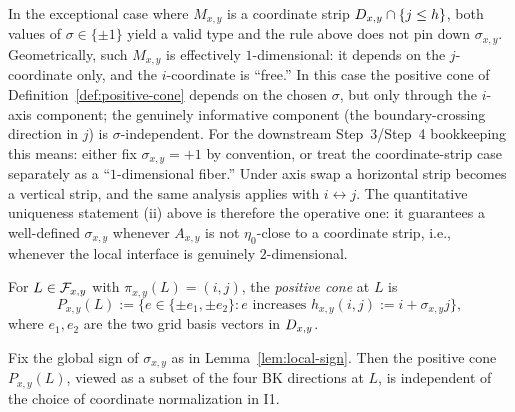 \begin{remark}\label{rem:strip-degeneracy}
In the exceptional case where $M_{x,y}$ is a coordinate strip
$D_{x,y}\cap\{j\le h\}$, both values of $\sigma\in\{\pm 1\}$ yield a valid type and
the rule above does not pin down $\sigma_{x,y}$. Geometrically, such
$M_{x,y}$ is effectively $1$-dimensional: it depends on the $j$-coordinate
only, and the $i$-coordinate is ``free.'' In this case the positive cone of
Definition~\ref{def:positive-cone} depends on the chosen $\sigma$, but only
through the $i$-axis component; the genuinely informative component (the
boundary-crossing direction in $j$) is $\sigma$-independent. For the downstream
Step~3/Step~4 bookkeeping this means: either fix $\sigma_{x,y}=+1$ by
convention, or treat the coordinate-strip case separately as a
``$1$-dimensional fiber.'' Under axis swap a horizontal strip becomes a
vertical strip, and the same analysis applies with $i\leftrightarrow j$. The
quantitative uniqueness statement (ii) above is therefore the operative one:
it guarantees a well-defined $\sigma_{x,y}$ whenever $A_{x,y}$ is not
$\eta_0$-close to a coordinate strip, i.e., whenever the local interface is
genuinely $2$-dimensional.
\end{remark}

\begin{definition}\label{def:positive-cone}
For $L\in\mathcal{F}_{x,y}$ with $\pi_{x,y}(L)=(i,j)$, the \emph{positive cone} at $L$ is
\[
  P_{x,y}(L) := \bigl\{e\in\{\pm e_1,\pm e_2\} : e \text{ increases } h_{x,y}(i,j):=i+\sigma_{x,y}j\bigr\},
\]
where $e_1,e_2$ are the two grid basis vectors in $D_{x,y}$.
\end{definition}

\begin{lemma}\label{lem:positive-cone-inv}
Fix the global sign of $\sigma_{x,y}$ as in Lemma~\ref{lem:local-sign}. Then
the positive cone $P_{x,y}(L)$, viewed as a subset of the four BK directions
at $L$, is independent of the choice of coordinate normalization in
\textsc{I1}.
\end{lemma}

